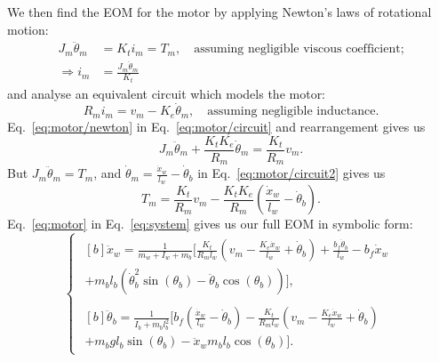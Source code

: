 \documentclass[11pt]{article} %
\begin{document}
We then find the \ac{EOM} for the motor by applying Newton's laws of rotational motion:
\begin{align}
  J_m \ddot{\theta}_m &= K_t i_m = T_m, \quad \text{assuming negligible viscous coefficient;}\nonumber \\
  \Rightarrow i_m &= \frac{J_m \ddot{\theta}_m}{K_t}\label{eq:motor/newton}
\end{align}
and analyse an equivalent circuit which models the motor:
\begin{equation}\label{eq:motor/circuit}
R_m i_m = v_m - K_e \dot{\theta}_m, \quad \text{assuming negligible inductance.}
\end{equation}
Eq.~\eqref{eq:motor/newton} in Eq.~\eqref{eq:motor/circuit} and rearrangement gives us
\begin{equation}\label{eq:motor/circuit2}
  J_m \ddot{\theta}_m
  + \frac{K_t K_e}{R_m} \dot{\theta}_m
  = \frac{K_t}{R_m}v_m.
\end{equation}
But $J_m \ddot{\theta}_m = T_m$, and $\dot{\theta}_m = \frac{\dot{x}_w}{l_w} - \dot{\theta}_b$ in Eq.~\eqref{eq:motor/circuit2} gives us
\begin{equation}\label{eq:motor}
  T_m = \frac{K_t}{R_m}v_m -
  \frac{K_t K_e}{R_m}\left(
    \frac{\dot{x}_w}{l_w}
    - \dot{\theta}_b
  \right).
\end{equation}
Eq.~\eqref{eq:motor} in Eq.~\eqref{eq:system} gives us our full \ac{EOM} in symbolic form:
\begin{equation}\label{eq:system-nonlinear}
  \begin{cases}
    \begin{aligned}[b]
      \ddot{x}_w =
      \frac{1}{m_w + I_w + m_b}\bigg[
      \frac{K_t}{R_m l_w}\left(
        v_m
        - \frac{K_e \dot{x}_w}{l_w}
        + \dot{\theta}_b
      \right)
      + \frac{b_f \dot{\theta}_b}{l_w}
      - b_f \dot{x}_w\\
      + m_b l_b \left(
        \dot{\theta}^2_b \sin(\theta_b)
        - \ddot{\theta}_b \cos(\theta_b)
      \right)
      \bigg],
    \end{aligned}\\[1em]
  \begin{aligned}[b]
    \ddot{\theta}_b =
    \frac{1}{I_b + m_b l_b^2}\bigg[
      b_f\left(
        \frac{\dot{x}_w}{l_w}
        - \dot{\theta}_b
      \right)
      - \frac{K_t}{R_m l_w}\left(
        v_m
        - \frac{K_e \dot{x}_w}{l_w}
        + \dot{\theta}_b
      \right)\\
      + m_b g l_b \sin(\theta_b)
      - \ddot{x}_w m_b l_b \cos(\theta_b)
    \bigg].
    \end{aligned}
  \end{cases}
\end{equation}
\end{document}
